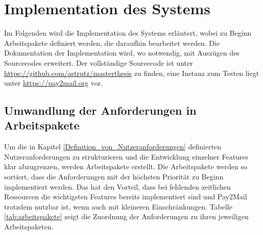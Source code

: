 \chapter{Implementation des Systems}
\label{Implementation_des_Systems}
Im Folgenden wird die Implementation des Systems erläutert, wobei zu Beginn Arbeitspakete definiert werden, die daraufhin bearbeitet werden. Die Dokumentation der Implementation wird, wo notwendig, mit Auszügen des Sourcecodes erweitert. Der vollständige Sourcecode ist unter \url{https://github.com/astrutz/masterthesis} zu finden, eine Instanz zum Testen liegt unter \url{https://pay2mail.org} vor.

\section{Umwandlung der Anforderungen in Arbeitspakete}
Um die in Kapitel \ref{Definition_von_Nutzeranforderungen} definierten Nutzeranforderungen zu strukturieren und die Entwicklung einzelner Features klar abzugrenzen, werden Arbeitspakete erstellt. Die Arbeitspakete werden so sortiert, dass die Anforderungen mit der höchsten Priorität zu Beginn implementiert werden. Das hat den Vorteil, dass bei fehlenden zeitlichen Ressourcen die wichtigsten Features bereits implementiert sind und Pay2Mail trotzdem nutzbar ist, wenn auch mit kleineren Einschränkungen. Tabelle \ref{tab:arbeitspakete} zeigt die Zuordnung der Anforderungen zu ihren jeweiligen Arbeitspaketen.


